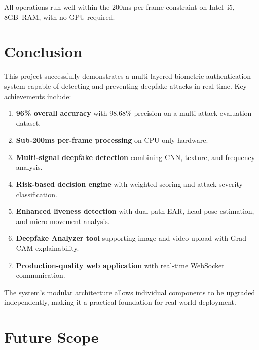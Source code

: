 \documentclass[conference,10pt]{IEEEtran}
\begin{document}
All operations run well within the 200ms per-frame constraint on Intel~i5, 8GB~RAM, with no GPU required.


\section{Conclusion}

This project successfully demonstrates a multi-layered biometric authentication system capable of detecting and preventing deepfake attacks in real-time. Key achievements include:

\begin{enumerate}
    \item \textbf{96\% overall accuracy} with 98.68\% precision on a multi-attack evaluation dataset.
    \item \textbf{Sub-200ms per-frame processing} on CPU-only hardware.
    \item \textbf{Multi-signal deepfake detection} combining CNN, texture, and frequency analysis.
    \item \textbf{Risk-based decision engine} with weighted scoring and attack severity classification.
    \item \textbf{Enhanced liveness detection} with dual-path EAR, head pose estimation, and micro-movement analysis.
    \item \textbf{Deepfake Analyzer tool} supporting image and video upload with Grad-CAM explainability.
    \item \textbf{Production-quality web application} with real-time WebSocket communication.
\end{enumerate}

The system's modular architecture allows individual components to be upgraded independently, making it a practical foundation for real-world deployment.


\section{Future Scope}
\end{document}
